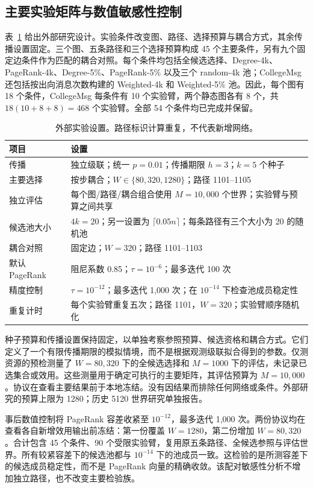 \documentclass[smallextended]{svjour3}
\begin{document}
\subsection{主要实验矩阵与数值敏感性控制}
表~\ref{tab:settings} 给出外部研究设计。实验条件改变图、路径、选择预算与耦合方式，其余传播设置固定。三个图、五条路径和三个选择预算构成 45 个主要条件，另有九个固定边条件作为匹配的耦合对照。每个条件均包括全候选选择、Degree-4k、PageRank-4k、Degree-5\%、PageRank-5\% 以及三个 random-4k 池；CollegeMsg 还包括按出向消息次数构建的 Weighted-4k 和 Weighted-5\% 池。因此，每个图有 18 个条件，CollegeMsg 每条件有 10 个实验臂，两个静态图各有 8 个，共 $18(10+8+8)=468$ 个实验臂。全部 54 个条件均已完成并保留。

\begin{table}[htbp]
\caption{外部实验设置。路径标识计算重复，不代表新增网络。}\label{tab:settings}
\begin{tabularx}{\linewidth}{lX}
\toprule
项目 & 设置 \\
\midrule
传播 & 独立级联；统一 $p=0.01$；传播期限 $h=3$；$k=5$ 个种子 \\
主要选择 & 按步耦合；$W\in\{80,320,1280\}$；路径 1101--1105 \\
独立评估 & 每个图/路径/耦合组合使用 $M=10,000$ 个世界；实验臂与预算之间共享 \\
候选池大小 & $4k=20$；另一设置为 $\lceil0.05n\rceil$；每条路径有三个大小为 20 的随机池 \\
耦合对照 & 固定边；$W=320$；路径 1101--1103 \\
默认 PageRank & 阻尼系数 0.85；$\tau=10^{-6}$；最多迭代 100 次 \\
精度控制 & $\tau=10^{-12}$；最多迭代 1,000 次；在 $10^{-14}$ 下检查池成员稳定性 \\
重复计时 & 每个实验臂重复五次；路径 1101，$W=320$；实验臂顺序随机化 \\
\bottomrule
\end{tabularx}
\end{table}

种子预算和传播设置保持固定，以单独考察参照预算、候选资格和耦合方式。它们定义了一个有限传播期限的模拟情境，而不是根据观测级联拟合得到的参数。仅测资源的预检测量了 $W=80,320$ 下的全候选选择和 $M=1000$ 下的评估，未记录已选集合或效用。这些测量用于确定可执行的主要矩阵，其评估预算为 $M=10,000$。协议在查看主要结果前于本地冻结。没有因结果而排除任何网络或条件。外部研究的预算上限为 1280；历史 5120 世界研究单独报告。

事后数值控制将 PageRank 容差收紧至 $10^{-12}$，最多迭代 1,000 次。两份协议均在查看各自新增效用输出前冻结：第一份覆盖 $W=1280$，第二份增加 $W=80,320$。合计包含 45 个条件、90 个受限实验臂，复用原五条路径、全候选参照与评估世界。所有较紧容差下的候选池都与 $10^{-14}$ 下的池成员一致。这检验的是所测容差下的候选成员稳定性，而不是 PageRank 向量的精确收敛。该配对敏感性分析不增加独立路径，也不改变主要检验族。
\end{document}
